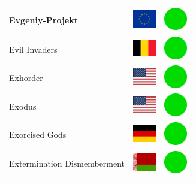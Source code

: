 \documentclass[12pt, a4paper, twoside]{report}
\begin{document}
\begin{center}
\begin{longtable}{|p{5cm}|p{2cm}|p{2cm}|}
 Evgeniy-Projekt                                            & \includegraphics[width=1cm]{../img/flags/eu} &   \includegraphics[width=1cm]{../likes/y} \\ \hline
 Evil Invaders                                              & \includegraphics[width=1cm]{../img/flags/be} &   \includegraphics[width=1cm]{../likes/y} \\ \hline
 Exhorder                                                   & \includegraphics[width=1cm]{../img/flags/us} &   \includegraphics[width=1cm]{../likes/y} \\ \hline
 Exodus                                                     & \includegraphics[width=1cm]{../img/flags/us} &   \includegraphics[width=1cm]{../likes/y} \\ \hline
 Exorcised Gods                                             & \includegraphics[width=1cm]{../img/flags/de} &   \includegraphics[width=1cm]{../likes/y} \\ \hline
 Extermination Dismemberment                                & \includegraphics[width=1cm]{../img/flags/by} &   \includegraphics[width=1cm]{../likes/y} \\ \hline

\end{longtable}
\end{center}
\end{document}
